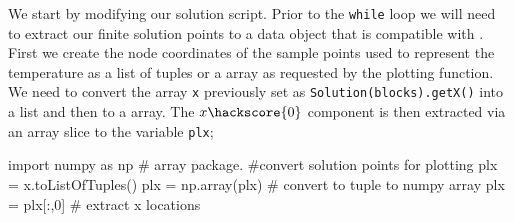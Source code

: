 We start by modifying our solution script.
Prior to the \verb|while| loop we will need to extract our finite solution points to a data object that is compatible with \mpl. First we create the node coordinates of the sample points used to represent
the temperature as a \pyt list of tuples or a \numpy array as requested by the plotting function. 
We need to convert the array \verb|x| previously set as \verb|Solution(blocks).getX()| into a \pyt list 
and then to a \numpy array. The $x\hackscore{0}$ component is then extracted via an array slice to the variable \verb|plx|; 
\begin{python}
import numpy as np # array package.
#convert solution points for plotting
plx = x.toListOfTuples() 
plx = np.array(plx) # convert to tuple to numpy array
plx = plx[:,0] # extract x locations
\end{python}


